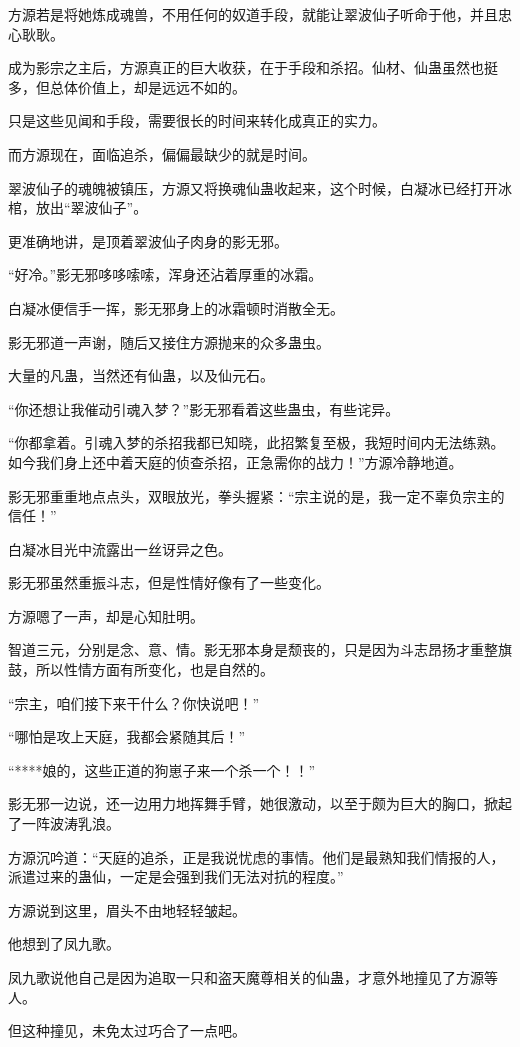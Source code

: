 \begin{this_body}
方源若是将她炼成魂兽，不用任何的奴道手段，就能让翠波仙子听命于他，并且忠心耿耿。

成为影宗之主后，方源真正的巨大收获，在于手段和杀招。仙材、仙蛊虽然也挺多，但总体价值上，却是远远不如的。

只是这些见闻和手段，需要很长的时间来转化成真正的实力。

而方源现在，面临追杀，偏偏最缺少的就是时间。

翠波仙子的魂魄被镇压，方源又将换魂仙蛊收起来，这个时候，白凝冰已经打开冰棺，放出“翠波仙子”。

更准确地讲，是顶着翠波仙子肉身的影无邪。

“好冷。”影无邪哆哆嗦嗦，浑身还沾着厚重的冰霜。

白凝冰便信手一挥，影无邪身上的冰霜顿时消散全无。

影无邪道一声谢，随后又接住方源抛来的众多蛊虫。

大量的凡蛊，当然还有仙蛊，以及仙元石。

“你还想让我催动引魂入梦？”影无邪看着这些蛊虫，有些诧异。

“你都拿着。引魂入梦的杀招我都已知晓，此招繁复至极，我短时间内无法练熟。如今我们身上还中着天庭的侦查杀招，正急需你的战力！”方源冷静地道。

影无邪重重地点点头，双眼放光，拳头握紧：“宗主说的是，我一定不辜负宗主的信任！”

白凝冰目光中流露出一丝讶异之色。

影无邪虽然重振斗志，但是性情好像有了一些变化。

方源嗯了一声，却是心知肚明。

智道三元，分别是念、意、情。影无邪本身是颓丧的，只是因为斗志昂扬才重整旗鼓，所以性情方面有所变化，也是自然的。

“宗主，咱们接下来干什么？你快说吧！”

“哪怕是攻上天庭，我都会紧随其后！”

“****娘的，这些正道的狗崽子来一个杀一个！！”

影无邪一边说，还一边用力地挥舞手臂，她很激动，以至于颇为巨大的胸口，掀起了一阵波涛乳浪。

方源沉吟道：“天庭的追杀，正是我说忧虑的事情。他们是最熟知我们情报的人，派遣过来的蛊仙，一定是会强到我们无法对抗的程度。”

方源说到这里，眉头不由地轻轻皱起。

他想到了凤九歌。

凤九歌说他自己是因为追取一只和盗天魔尊相关的仙蛊，才意外地撞见了方源等人。

但这种撞见，未免太过巧合了一点吧。


\end{this_body}
